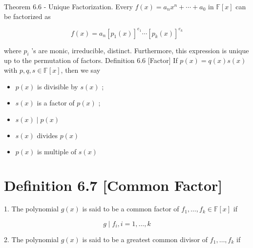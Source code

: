 \documentclass[11pt]{article}
\begin{document}
Theorem 6.6 - Unique Factorization. Every \(f\left( x\right)  = {a}_n{x}^n + \cdots  + {a}_{0}\) in \(\mathbb{F}\left\lbrack  x\right\rbrack\) can be factorized as

\[
f\left( x\right)  = {a}_n{\left\lbrack  {p}_1\left( x\right) \right\rbrack  }^{{e}_1}\cdots {\left\lbrack  {p}_{k}\left( x\right) \right\rbrack  }^{{e}_{k}}
\]

where \({p}_{i}\) ’s are monic, irreducible, distinct. Furthermore, this expression is unique up to the permutation of factors. Definition 6.6 [Factor] If \(p\left( x\right)  = q\left( x\right) s\left( x\right)\) with \(p,q,s \in  \mathbb{F}\left\lbrack  x\right\rbrack\), then we say

\begin{itemize}
\item \(p\left( x\right)\) is divisible by \(s\left( x\right)\) ;
\end{itemize}

\begin{itemize}
\item \(s\left( x\right)\) is a factor of \(p\left( x\right)\) ;
\end{itemize}

\begin{itemize}
\item \(s\left( x\right)  \mid  p\left( x\right)\)
\end{itemize}

\begin{itemize}
\item \(s\left( x\right)\) divides \(p\left( x\right)\)
\end{itemize}

\begin{itemize}
\item \(p\left( x\right)\) is multiple of \(s\left( x\right)\)
\end{itemize}

\section*{Definition 6.7 [Common Factor]}

1. The polynomial \(g\left( x\right)\) is said to be a common factor of \({f}_1,\ldots ,{f}_{k} \in  \mathbb{F}\left\lbrack  x\right\rbrack\) if

\[
g \mid  {f}_{i},i = 1,\ldots ,k
\]

2. The polynomial \(g\left( x\right)\) is said to be a greatest common divisor of \({f}_1,\ldots ,{f}_{k}\) if
\end{document}
